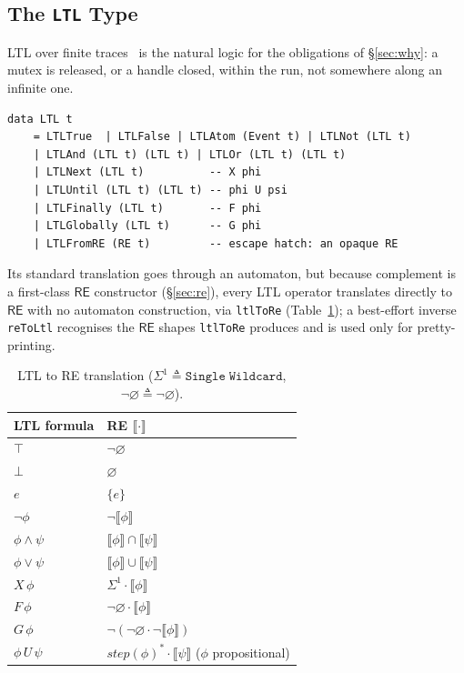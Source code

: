 \documentclass[acmsmall,screen]{acmart}
\newcommand{\RE}{\mathsf{RE}}
\newcommand{\sem}[1]{\llbracket #1 \rrbracket}
\newcommand{\univ}{\neg\varnothing}
\begin{document}
\subsection{The \texttt{LTL} Type}

LTL over finite traces~\cite{degiacomo2013} is the natural logic for the
obligations of \S\ref{sec:why}: a mutex is released, or a handle closed,
within the run, not somewhere along an infinite one.
\begin{lstlisting}
data LTL t
    = LTLTrue  | LTLFalse | LTLAtom (Event t) | LTLNot (LTL t)
    | LTLAnd (LTL t) (LTL t) | LTLOr (LTL t) (LTL t)
    | LTLNext (LTL t)          -- X phi
    | LTLUntil (LTL t) (LTL t) -- phi U psi
    | LTLFinally (LTL t)       -- F phi
    | LTLGlobally (LTL t)      -- G phi
    | LTLFromRE (RE t)         -- escape hatch: an opaque RE
\end{lstlisting}
Its standard translation goes through an automaton, but because complement
is a first-class $\RE$ constructor (\S\ref{sec:re}), every LTL operator
translates directly to $\RE$ with no automaton construction, via
\lstinline{ltlToRe} (Table~\ref{tab:ltl}); a best-effort inverse
\lstinline{reToLtl} recognises the $\RE$ shapes \lstinline{ltlToRe}
produces and is used only for pretty-printing.

\begin{table}[ht]
\caption{LTL to RE translation ($\Sigma^1 \triangleq \mathtt{Single\;Wildcard}$,
         $\univ \triangleq \neg\varnothing$).}
\label{tab:ltl}
\begin{tabular}{ll}
\toprule
LTL formula & RE $\sem{\cdot}$ \\
\midrule
$\top$              & $\univ$ \\
$\bot$              & $\varnothing$ \\
$e$                 & $\{e\}$ \\
$\neg\phi$          & $\neg\sem{\phi}$ \\
$\phi \wedge \psi$  & $\sem{\phi} \cap \sem{\psi}$ \\
$\phi \vee \psi$    & $\sem{\phi} \cup \sem{\psi}$ \\
$X\,\phi$           & $\Sigma^1 \cdot \sem{\phi}$ \\
$F\,\phi$           & $\univ \cdot \sem{\phi}$ \\
$G\,\phi$           & $\neg(\univ \cdot \neg\sem{\phi})$ \\
$\phi\,U\,\psi$     & $\mathit{step}(\phi)^* \cdot \sem{\psi}$
                      \quad ($\phi$ propositional) \\
\bottomrule
\end{tabular}
\end{table}
\end{document}
